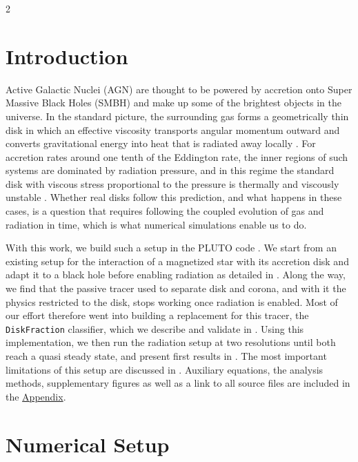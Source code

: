 	\begin{multicols}{2}

	\section{Introduction}

	Active Galactic Nuclei (AGN) are thought to be powered by accretion onto Super Massive Black Holes (SMBH) and make up some of
	the brightest objects in the universe. In the standard picture, the surrounding gas forms a geometrically thin disk in which
	an effective viscosity transports angular momentum outward and converts gravitational energy into heat that is radiated away
	locally \cite{shak1973}. For accretion rates around one tenth of the Eddington rate, the inner regions of such systems are
	dominated by radiation pressure, and in this regime the standard disk with viscous stress proportional to the pressure is
	thermally and viscously unstable \cite{ligh1974, shak1976}. Whether real disks follow this prediction, and what happens in
	these cases, is a question that requires following the coupled evolution of gas and radiation in time, which is what numerical
	simulations enable us to do.

	With this work, we build such a setup in the PLUTO code \cite{mign2007}. We start from an existing setup for the interaction of
	a magnetized star with its accretion disk \cite{ceme2019} and adapt it to a black hole before enabling radiation as detailed in
	. Along the way, we find that the passive tracer used to separate disk and corona, and with it the physics restricted
	to the disk, stops working once radiation is enabled. Most of our effort therefore went into building a replacement for this tracer,
	the \texttt{DiskFraction} classifier, which we describe and validate in . Using this implementation, we then run
	the radiation setup at two resolutions until both reach a quasi steady state, and present first results in . The
	most important limitations of this setup are discussed in . Auxiliary equations, the analysis methods, supplementary
	figures as well as a link to all source files are included in the \hyperref[sec:appendix]{Appendix}.

	\section{Numerical Setup}
	\label{sec:setup}


\end{multicols}
